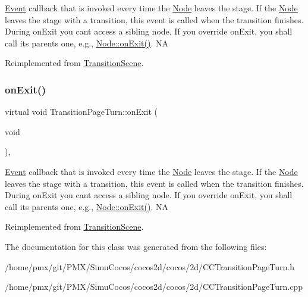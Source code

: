 \hyperlink{classEvent}{Event} callback that is invoked every time the \hyperlink{classNode}{Node} leaves the \textquotesingle{}stage\textquotesingle{}. If the \hyperlink{classNode}{Node} leaves the \textquotesingle{}stage\textquotesingle{} with a transition, this event is called when the transition finishes. During on\+Exit you can\textquotesingle{}t access a sibling node. If you override on\+Exit, you shall call its parent\textquotesingle{}s one, e.\+g., \hyperlink{classNode_ac83de835ea315e3179d4293acd8903ac}{Node\+::on\+Exit()}.  NA 

Reimplemented from \hyperlink{classTransitionScene_a45e39b658189c79428a05c3bc3173bbb}{Transition\+Scene}.

\mbox{\label{classTransitionPageTurn_adf4182d3e59e362c1ca5beec367d7bf9}} 
\subsubsection{\texorpdfstring{on\+Exit()}{onExit()}\hspace{0.1cm}{\footnotesize\ttfamily [2/2]}}
{\footnotesize\ttfamily virtual void Transition\+Page\+Turn\+::on\+Exit (\begin{DoxyParamCaption}\item[{void}]{ }\end{DoxyParamCaption})\hspace{0.3cm}{\ttfamily [override]}, {\ttfamily [virtual]}}

\hyperlink{classEvent}{Event} callback that is invoked every time the \hyperlink{classNode}{Node} leaves the \textquotesingle{}stage\textquotesingle{}. If the \hyperlink{classNode}{Node} leaves the \textquotesingle{}stage\textquotesingle{} with a transition, this event is called when the transition finishes. During on\+Exit you can\textquotesingle{}t access a sibling node. If you override on\+Exit, you shall call its parent\textquotesingle{}s one, e.\+g., \hyperlink{classNode_ac83de835ea315e3179d4293acd8903ac}{Node\+::on\+Exit()}.  NA 

Reimplemented from \hyperlink{classTransitionScene_a45e39b658189c79428a05c3bc3173bbb}{Transition\+Scene}.



The documentation for this class was generated from the following files\+:\begin{DoxyCompactItemize}
\item 
/home/pmx/git/\+P\+M\+X/\+Simu\+Cocos/cocos2d/cocos/2d/C\+C\+Transition\+Page\+Turn.\+h\item 
/home/pmx/git/\+P\+M\+X/\+Simu\+Cocos/cocos2d/cocos/2d/C\+C\+Transition\+Page\+Turn.\+cpp\end{DoxyCompactItemize}
